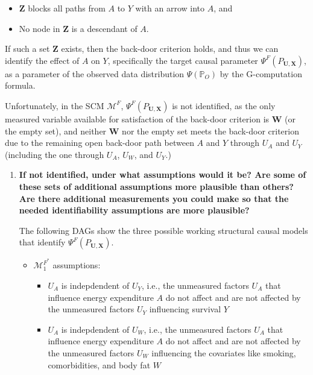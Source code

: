 \documentclass{article}\usepackage[]{graphicx}\usepackage[]{xcolor}
\begin{document}
\begin{enumerate}[label=\textbf{\arabic*.}]
  \begin{itemize}
    \item $\bm{Z}$ blocks all paths from $A$ to $Y$ with an arrow into $A$, and
    \item No node in $\bm{Z}$ is a descendant of $A$.
  \end{itemize}
  
If such a set $\bm{Z}$ exists, then the back-door criterion holds, and thus we can identify the effect of $A$ on $Y$, specifically the target causal parameter $\Psi^F(P_{\bm{U},\bm{X}})$, as a parameter of the observed data distribution $\Psi(\mathbb{P}_O)$ by the G-computation formula.
  
Unfortunately, in the SCM $\mathcal{M}^{F}$, $\Psi^F(P_{\bm{U},\bm{X}})$ is not identified, as the only measured variable available for satisfaction of the back-door criterion is $\bm{W}$ (or the empty set), and neither $\bm{W}$ nor the empty set meets the back-door criterion due to the remaining open back-door path between $A$ and $Y$ through $U_A$ and $U_Y$ (including the one through $U_A$, $U_W$, and $U_Y$.)
  
  \begin{enumerate}[label=\textbf{(\alph*)}]
  
    \item \textbf{If not identified, under what assumptions would it be? Are some of these sets of additional assumptions more plausible than others? Are there additional measurements you could make so that the needed identifiability assumptions are more plausible?}
    
    The following DAGs show the three possible working structural causal models that identify $\Psi^F(P_{\bm{U},\bm{X}})$.
    
\begin{itemize}

  \item $\mathcal{M}^{F^*}_1$ assumptions: 
  
  \begin{itemize} 
  
    \item $U_A$ is indepdendent of $U_Y$, i.e., the unmeasured factors $U_A$ that influence energy expenditure $A$ do not affect and are not affected by the unmeasured factors $U_Y$ influencing survival $Y$
    
    \item $U_A$ is indepdendent of $U_W$, i.e., the unmeasured factors $U_A$ that influence energy expenditure $A$ do not affect and are not affected by the unmeasured factors $U_W$ influencing the covariates like smoking, comorbidities, and body fat $W$
    

\end{itemize}
\end{itemize}
\end{enumerate}
\end{enumerate}
\end{document}
